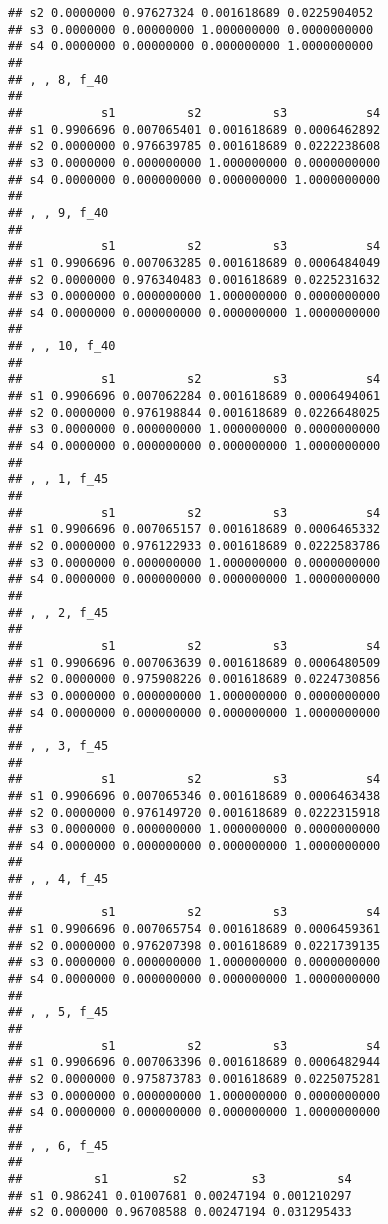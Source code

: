 \documentclass[
]{article}
\begin{document}
\begin{verbatim}
## s2 0.0000000 0.97627324 0.001618689 0.0225904052
## s3 0.0000000 0.00000000 1.000000000 0.0000000000
## s4 0.0000000 0.00000000 0.000000000 1.0000000000
## 
## , , 8, f_40
## 
##           s1          s2          s3           s4
## s1 0.9906696 0.007065401 0.001618689 0.0006462892
## s2 0.0000000 0.976639785 0.001618689 0.0222238608
## s3 0.0000000 0.000000000 1.000000000 0.0000000000
## s4 0.0000000 0.000000000 0.000000000 1.0000000000
## 
## , , 9, f_40
## 
##           s1          s2          s3           s4
## s1 0.9906696 0.007063285 0.001618689 0.0006484049
## s2 0.0000000 0.976340483 0.001618689 0.0225231632
## s3 0.0000000 0.000000000 1.000000000 0.0000000000
## s4 0.0000000 0.000000000 0.000000000 1.0000000000
## 
## , , 10, f_40
## 
##           s1          s2          s3           s4
## s1 0.9906696 0.007062284 0.001618689 0.0006494061
## s2 0.0000000 0.976198844 0.001618689 0.0226648025
## s3 0.0000000 0.000000000 1.000000000 0.0000000000
## s4 0.0000000 0.000000000 0.000000000 1.0000000000
## 
## , , 1, f_45
## 
##           s1          s2          s3           s4
## s1 0.9906696 0.007065157 0.001618689 0.0006465332
## s2 0.0000000 0.976122933 0.001618689 0.0222583786
## s3 0.0000000 0.000000000 1.000000000 0.0000000000
## s4 0.0000000 0.000000000 0.000000000 1.0000000000
## 
## , , 2, f_45
## 
##           s1          s2          s3           s4
## s1 0.9906696 0.007063639 0.001618689 0.0006480509
## s2 0.0000000 0.975908226 0.001618689 0.0224730856
## s3 0.0000000 0.000000000 1.000000000 0.0000000000
## s4 0.0000000 0.000000000 0.000000000 1.0000000000
## 
## , , 3, f_45
## 
##           s1          s2          s3           s4
## s1 0.9906696 0.007065346 0.001618689 0.0006463438
## s2 0.0000000 0.976149720 0.001618689 0.0222315918
## s3 0.0000000 0.000000000 1.000000000 0.0000000000
## s4 0.0000000 0.000000000 0.000000000 1.0000000000
## 
## , , 4, f_45
## 
##           s1          s2          s3           s4
## s1 0.9906696 0.007065754 0.001618689 0.0006459361
## s2 0.0000000 0.976207398 0.001618689 0.0221739135
## s3 0.0000000 0.000000000 1.000000000 0.0000000000
## s4 0.0000000 0.000000000 0.000000000 1.0000000000
## 
## , , 5, f_45
## 
##           s1          s2          s3           s4
## s1 0.9906696 0.007063396 0.001618689 0.0006482944
## s2 0.0000000 0.975873783 0.001618689 0.0225075281
## s3 0.0000000 0.000000000 1.000000000 0.0000000000
## s4 0.0000000 0.000000000 0.000000000 1.0000000000
## 
## , , 6, f_45
## 
##          s1         s2         s3          s4
## s1 0.986241 0.01007681 0.00247194 0.001210297
## s2 0.000000 0.96708588 0.00247194 0.031295433

\end{verbatim}
\end{document}
